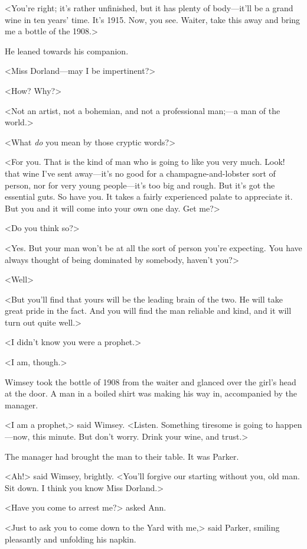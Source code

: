 <You're right; it's rather unfinished, but it has plenty of body—it'll be a grand wine in ten years' time. It's 1915. Now, you see. Waiter, take this away and bring me a bottle of the 1908.>

He leaned towards his companion.

<Miss Dorland—may I be impertinent?>

<How? Why?>

<Not an artist, not a bohemian, and not a professional man;—a man of the world.>

<What \emph{do} you mean by those cryptic words?>

<For you. That is the kind of man who is going to like you very much. Look! that wine I've sent away—it's no good for a champagne-and-lobster sort of person, nor for very young people—it's too big and rough. But it's got the essential guts. So have you. It takes a fairly experienced palate to appreciate it. But you and it will come into your own one day. Get me?>

<Do you think so?>

<Yes. But your man won't be at all the sort of person you're expecting. You have always thought of being dominated by somebody, haven't you?>

<Well\longdash>

<But you'll find that yours will be the leading brain of the two. He will take great pride in the fact. And you will find the man reliable and kind, and it will turn out quite well.>

<I didn't know you were a prophet.>

<I am, though.>

Wimsey took the bottle of 1908 from the waiter and glanced over the girl's head at the door. A man in a boiled shirt was making his way in, accompanied by the manager.

<I am a prophet,> said Wimsey. <Listen. Something tiresome is going to happen—now, this minute. But don't worry. Drink your wine, and trust.>

The manager had brought the man to their table. It was Parker.

<Ah!> said Wimsey, brightly. <You'll forgive our starting without you, old man. Sit down. I think you know Miss Dorland.>

<Have you come to arrest me?> asked Ann.

<Just to ask you to come down to the Yard with me,> said Parker, smiling pleasantly and unfolding his napkin.

